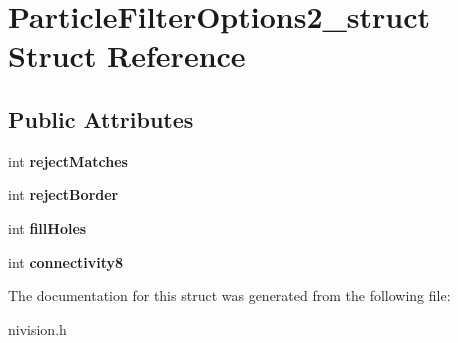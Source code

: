 \hypertarget{structParticleFilterOptions2__struct}{\section{\-Particle\-Filter\-Options2\-\_\-struct \-Struct \-Reference}
\label{structParticleFilterOptions2__struct}
}
\subsection*{\-Public \-Attributes}
\begin{DoxyCompactItemize}
\item 
\hypertarget{structParticleFilterOptions2__struct_a7a004756eeb6af7e10968520b3f3c188}{int {\bfseries reject\-Matches}}\label{structParticleFilterOptions2__struct_a7a004756eeb6af7e10968520b3f3c188}

\item 
\hypertarget{structParticleFilterOptions2__struct_a4978b24c71bce09bdb69fa5624611e0e}{int {\bfseries reject\-Border}}\label{structParticleFilterOptions2__struct_a4978b24c71bce09bdb69fa5624611e0e}

\item 
\hypertarget{structParticleFilterOptions2__struct_a86b5320628cdaf7759d1da9477e72284}{int {\bfseries fill\-Holes}}\label{structParticleFilterOptions2__struct_a86b5320628cdaf7759d1da9477e72284}

\item 
\hypertarget{structParticleFilterOptions2__struct_a8ad838f2fb729a028152f66eb1629277}{int {\bfseries connectivity8}}\label{structParticleFilterOptions2__struct_a8ad838f2fb729a028152f66eb1629277}

\end{DoxyCompactItemize}


\-The documentation for this struct was generated from the following file\-:\begin{DoxyCompactItemize}
\item 
nivision.\-h\end{DoxyCompactItemize}
